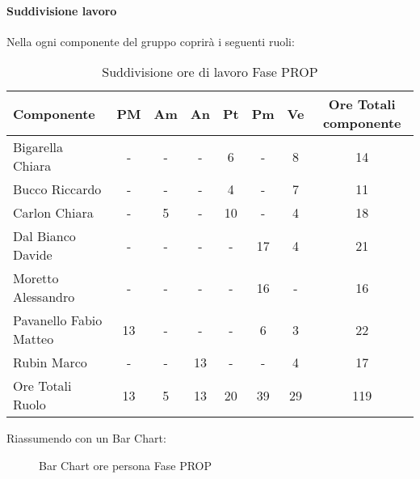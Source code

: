 			\paragraph{Suddivisione lavoro}
				Nella  ogni componente del gruppo \groupname{} coprirà i seguenti ruoli:
				\begin{table}
					\begin{center}
						\begin{tabular}{| l | c | c | c | c | c | c | c |}
							\hline
							Componente 					& PM		& Am 		& An 		& Pt 		& Pm 	& Ve 		& Ore Totali componente \\ \hline
							
							Bigarella Chiara 			& - 		& - 		& - 		& 6 		& - 		& 8 		& 14 \\
							Bucco Riccardo 				& - 		& - 		& - 		& 4 		& -			& 7 		& 11 \\
							Carlon Chiara	 			& - 		& 5 		& - 		& 10 		& - 		& 4 		& 18 \\
							Dal Bianco Davide 			& - 		& - 		& - 		& - 		& 17 		& 4 		& 21 \\
							Moretto Alessandro 			& - 		& - 		& - 		& - 		& 16 		& - 		& 16 \\
							Pavanello Fabio Matteo	 	& 13 		& - 		& - 		& - 		& 6 		& 3 		& 22 \\
							Rubin Marco					& - 		& - 		& 13 		& - 		& - 		& 4 		& 17 \\ \hline \hline
							
							Ore Totali Ruolo 			& 13 		& 5 		& 13 		& 20 		& 39 		& 29 		& 119\\ \hline
						\end{tabular}
					\end{center}
					\caption{Suddivisione ore di lavoro Fase PROP}
				\end{table}
				Riassumendo con un Bar Chart:
				\begin{figure}\centering
					\caption{Bar Chart ore persona Fase PROP}
				\end{figure}
